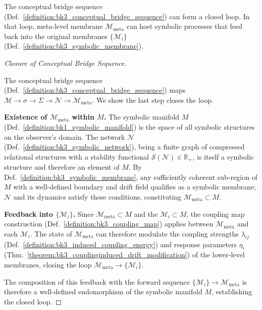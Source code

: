 \begin{theorem} \label{theorem:bk3_closure_conceptual_bridge_sequence}
\leavevmode\newline
The conceptual bridge sequence (Def.~\ref{definition:bk3_conceptual_bridge_sequence}) can form a closed loop.
In that loop, meta-level membrane $\mathcal{M}_{\text{meta}}$ can host symbolic processes that feed back into the original membranes $\{\mathcal{M}_i\}$ (Def.~\ref{definition:bk3_symbolic_membrane}).
\end{theorem}

\begin{proof}[Closure of Conceptual Bridge Sequence]
\label{proof:bk3_sketch_evolutionary_dynamics}
\leavevmode

The conceptual bridge sequence (Def.~\ref{definition:bk3_conceptual_bridge_sequence})
maps $\mathcal{M} \to \sigma \to \Sigma \to \mathcal{N} \to \mathcal{M}_{\text{meta}}$.
We show the last step closes the loop.

\textbf{Existence of $\mathcal{M}_{\text{meta}}$ within $M$.}
The symbolic manifold $M$ (Def.~\ref{definition:bk1_symbolic_manifold}) is the
space of all symbolic structures on the observer's domain. The network
$\mathcal{N}$ (Def.~\ref{definition:bk3_symbolic_network}), being a finite graph
of compressed relational structures with a stability functional
$\mathcal{S}(\mathcal{N}) \in \mathbb{R}_+$, is itself a symbolic structure and
therefore an element of $M$. By Def.~\ref{definition:bk3_symbolic_membrane},
any sufficiently coherent sub-region of $M$ with a well-defined boundary and
drift field qualifies as a symbolic membrane; $\mathcal{N}$ and its dynamics
satisfy these conditions, constituting $\mathcal{M}_{\text{meta}} \subset M$.

\textbf{Feedback into $\{\mathcal{M}_i\}$.}
Since $\mathcal{M}_{\text{meta}} \subset M$ and the $\mathcal{M}_i \subset M$,
the coupling map construction (Def.~\ref{definition:bk3_coupling_map}) applies
between $\mathcal{M}_{\text{meta}}$ and each $\mathcal{M}_i$. The state of
$\mathcal{M}_{\text{meta}}$ can therefore modulate the coupling strengths
$\lambda_{ij}$ (Def.~\ref{definition:bk3_induced_coupling_energy}) and response
parameters $\eta_i$ (Thm.~\ref{theorem:bk3_couplinginduced_drift_modification})
of the lower-level membranes, closing the loop
$\mathcal{M}_{\text{meta}} \to \{\mathcal{M}_i\}$.

The composition of this feedback with the forward sequence
$\{\mathcal{M}_i\} \to \mathcal{M}_{\text{meta}}$ is therefore a well-defined
endomorphism of the symbolic manifold $M$, establishing the closed loop.
\end{proof}

